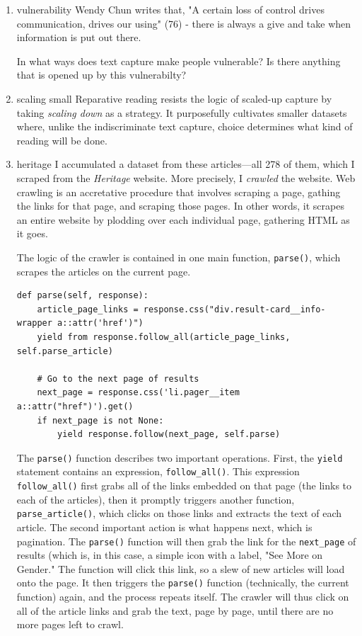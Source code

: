 \documentclass[11pt]{article}
\begin{document}
\begin{enumerate}
\item vulnerability
\label{sec:org4849f79}
Wendy Chun writes that, "A certain loss of control drives
communication, drives our using" (76) - there is always a give and
take when information is put out there.

In what ways does text capture make people vulnerable? Is there
anything that is opened up by this vulnerabilty?

\item scaling small
\label{sec:org1fa8f0f}
Reparative reading resists the logic of scaled-up capture by taking
\emph{scaling down} as a strategy. It purposefully cultivates smaller
datasets where, unlike the indiscriminate text capture, choice
determines what kind of reading will be done.

\item heritage
\label{sec:org98bcc10}
I accumulated a dataset from these articles---all 278 of them, which I
scraped from the \emph{Heritage} website. More precisely, I \emph{crawled} the
website. Web crawling is an accretative procedure that involves
scraping a page, gathing the links for that page, and scraping those
pages. In other words, it scrapes an entire website by plodding over
each individual page, gathering HTML as it goes.

The logic of the crawler is contained in one main function, \texttt{parse()},
which scrapes the articles on the current page.
\begin{verbatim}
def parse(self, response):
    article_page_links = response.css("div.result-card__info-wrapper a::attr('href')")
    yield from response.follow_all(article_page_links, self.parse_article)

    # Go to the next page of results
    next_page = response.css('li.pager__item a::attr("href")').get()
    if next_page is not None:
        yield response.follow(next_page, self.parse)
\end{verbatim}
The \texttt{parse()} function describes two important operations. First, the
\texttt{yield} statement contains an expression, \texttt{follow\_all()}. This
expression \texttt{follow\_all()} first grabs all of the links embedded on
that page (the links to each of the articles), then it promptly
triggers another function, \texttt{parse\_article()}, which clicks on those
links and extracts the text of each article. The second important
action is what happens next, which is pagination. The \texttt{parse()}
function will then grab the link for the \texttt{next\_page} of results (which
is, in this case, a simple icon with a label, "See More on Gender."
The function will click this link, so a slew of new articles will load
onto the page. It then triggers the \texttt{parse()} function (technically,
the current function) again, and the process repeats itself. The
crawler will thus click on all of the article links and grab the text,
page by page, until there are no more pages left to crawl.


\end{enumerate}
\end{document}
